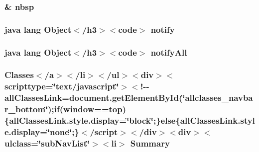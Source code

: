 \hypertarget{_sensor_8_sensor_type_8html_aef915316f784c9063d942974538301a6}{
\subsubsection[{nbsp}]{\setlength{\rightskip}{0pt plus 5cm}\& nbsp}}\label{_sensor_8_sensor_type_8html_aef915316f784c9063d942974538301a6}
\hypertarget{_sensor_8_sensor_type_8html_ae99ae10b5010594dbda4794e02db271b}{
\subsubsection[{notify}]{\setlength{\rightskip}{0pt plus 5cm}java lang Object$<$/h3$>$$<$code$>$ notify}}\label{_sensor_8_sensor_type_8html_ae99ae10b5010594dbda4794e02db271b}
\hypertarget{_sensor_8_sensor_type_8html_a1279357e6e09e33e75b55eb05fdb6436}{
\subsubsection[{notify\-All}]{\setlength{\rightskip}{0pt plus 5cm}java lang Object$<$/h3$>$$<$code$>$ notify\-All}}\label{_sensor_8_sensor_type_8html_a1279357e6e09e33e75b55eb05fdb6436}
\hypertarget{_sensor_8_sensor_type_8html_a6f9ab45abc9b0679dc1b132fbacfc681}{
\subsubsection[{Summary}]{\setlength{\rightskip}{0pt plus 5cm}Classes$<$/{\bf a}$>$$<$/li$>$$<$/ul$>$$<$div$>$$<$scripttype=\char`\"{}text/javascript\char`\"{}$>$$<$!-\/-\/all\-Classes\-Link=document.\-get\-Element\-By\-Id(\char`\"{}allclasses\-\_\-navbar\-\_\-bottom\char`\"{});if(window==top)\{all\-Classes\-Link.\-style.\-display=\char`\"{}block\char`\"{};\}else\{all\-Classes\-Link.\-style.\-display=\char`\"{}none\char`\"{};\}$<$/script$>$$<$/div$>$$<$div$>$$<$ulclass=\char`\"{}sub\-Nav\-List\char`\"{}$>$$<$li$>$ Summary}}\label{_sensor_8_sensor_type_8html_a6f9ab45abc9b0679dc1b132fbacfc681}
